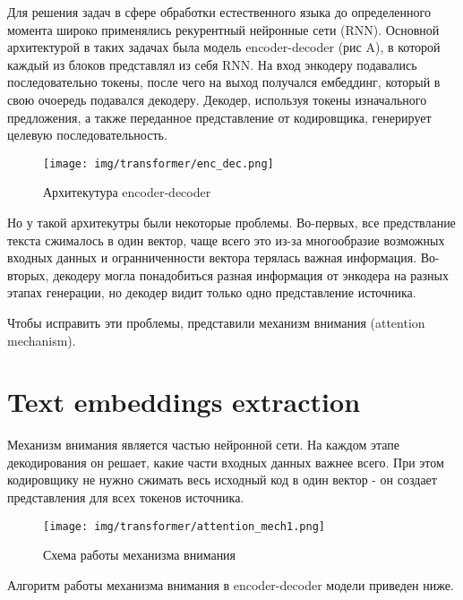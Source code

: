 \documentclass[PMI,VKR]{HSEUniversity}
\begin{document}
Для решения задач в сфере обработки естественного языка до определенного момента широко применялись рекурентный нейронные сети (RNN). Основной архитектурой в таких задачах была модель encoder-decoder\cite{seq2seq:2014} (рис A), в которой каждый из блоков  представлял из себя RNN. 
На вход энкодеру подавались последовательно токены, после чего на выход получался ембеддинг, который в свою очоередь подавался декодеру. Декодер, используя токены изначального предложения, а также переданное представление от кодировщика, генерирует целевую последовательность.

\begin{figure}[h]
    \centering
    \texttt{[image: img/transformer/enc\_dec.png]}
    \caption{Архитекутура encoder-decoder}
\end{figure}

Но у такой архитекутры были некоторые проблемы. Во-первых, все предствлание текста сжималось в один вектор, чаще всего это из-за многообразие возможных входных данных и огранниченности вектора терялась важная информация. Во-вторых, декодеру могла понадобиться разная информация от энкодера на разных этапах генерации, но декодер видит только одно представление источника. 

Чтобы исправить эти проблемы, представили механизм внимания (attention mechanism\cite{attention:2014}). 

\section{Text embeddings extraction}

Механизм внимания является частью нейронной сети. На каждом этапе декодирования он решает, какие части входных данных важнее всего. При этом кодировщику не нужно сжимать весь исходный код в один вектор - он создает представления для всех токенов источника.

\begin{figure}[h]
    \centering
    \texttt{[image: img/transformer/attention\_mech1.png]}
    \caption{Схема работы механизма внимания}
\end{figure}

\newpage
Алгоритм работы механизма внимания в encoder-decoder модели приведен ниже.
\end{document}
